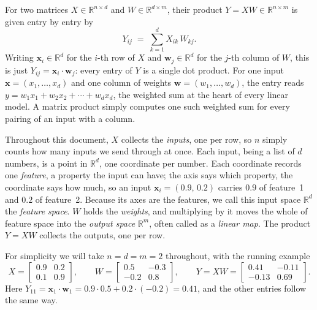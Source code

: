 \documentclass[11pt]{article}
\begin{document}
For two matrices $X\in\mathbb{R}^{n\times d}$ and $W\in\mathbb{R}^{d\times m}$, their product $Y=XW\in\mathbb{R}^{n\times m}$ is given entry by entry by
\[
Y_{ij} \;=\; \sum_{k=1}^{d} X_{ik}\,W_{kj}.
\]
Writing $\mathbf{x}_i\in\mathbb{R}^{d}$ for the $i$-th row of $X$ and $\mathbf{w}_j\in\mathbb{R}^{d}$ for the $j$-th column of $W$, this is just $Y_{ij}=\mathbf{x}_i\cdot\mathbf{w}_j$: every entry of $Y$ is a single dot product. For one input $\mathbf{x} = (x_1, \ldots, x_d)$ and one column of weights $\mathbf{w} = (w_1, \ldots, w_d)$, the entry reads $y = w_1x_1 + w_2x_2 + \cdots + w_dx_d$, the weighted sum at the heart of every linear model. A matrix product simply computes one such weighted sum for every pairing of an input with a column.

Throughout this document, $X$ collects the \emph{inputs}, one per row, so $n$ simply counts how many inputs we send through at once. Each input, being a list of $d$ numbers, is a point in $\mathbb{R}^{d}$, one coordinate per number. Each coordinate records one \emph{feature}, a property the input can have; the axis says which property, the coordinate says how much, so an input $\mathbf{x}_i = (0.9,\, 0.2)$ carries $0.9$ of feature~1 and $0.2$ of feature~2. Because its axes are the features, we call this input space $\mathbb{R}^{d}$ the \emph{feature space}. $W$ holds the \emph{weights}, and multiplying by it moves the whole of feature space into the \emph{output space} $\mathbb{R}^{m}$, often called as a \emph{linear map}. The product $Y = XW$ collects the outputs, one per row.

For simplicity we will take $n=d=m=2$ throughout, with the running example
\[
X=\begin{bmatrix} 0.9 & 0.2 \\ 0.1 & 0.9 \end{bmatrix},
\qquad
W=\begin{bmatrix} 0.5 & -0.3 \\ -0.2 & 0.8 \end{bmatrix},
\qquad
Y=XW=\begin{bmatrix} 0.41 & -0.11 \\ -0.13 & 0.69 \end{bmatrix}.
\]
Here $Y_{11}=\mathbf{x}_1\cdot\mathbf{w}_1 = 0.9\cdot0.5+0.2\cdot(-0.2) = 0.41$, and the other entries follow the same way.
\end{document}

